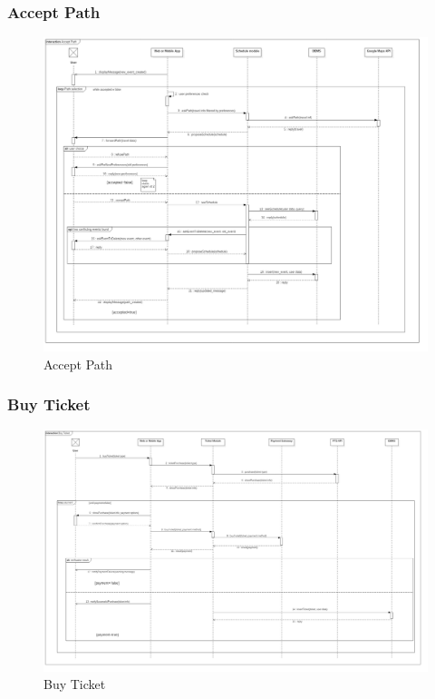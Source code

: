 \documentclass{article}
\begin{document}
				\subsubsection{Accept Path}
				\begin{figure}[H]
				\includegraphics[width=\linewidth]{Images/Sequence_Diagrams/4-Accept_Path_DD.jpg}
				\caption{Accept Path}
				\label{fig:SD4}
				\end{figure}
				\subsubsection{Buy Ticket}
				\begin{figure}[H]
				\includegraphics[width=\linewidth]{Images/Sequence_Diagrams/5-Buy_Ticket_DD.jpg}
				\caption{Buy Ticket}
				\label{fig:SD5}
				\end{figure}
\end{document}
